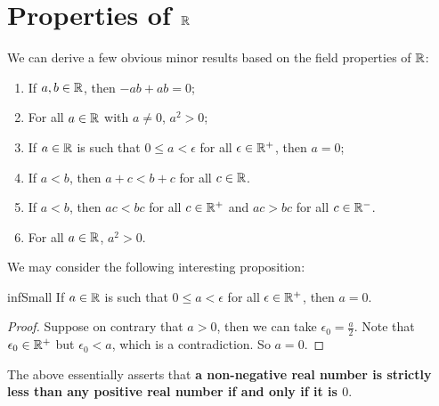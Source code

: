 \documentclass[math]{amznotes}
\theoremstyle{remark}
\begin{document}
\section{Properties of $\mathbb{R}$}
We can derive a few obvious minor results based on the field properties of $\mathbb{R}$:
\begin{enumerate}
    \item If $a, b \in \mathbb{R}$, then $-ab + ab = 0$;
    \item For all $a \in \mathbb{R}$ with $a \neq 0$, $a^2 > 0$;
    \item If $a \in \mathbb{R}$ is such that $0 \leq a < \epsilon$ for all $\epsilon \in \mathbb{R}^+$, then $a = 0$;
    \item If $a < b$, then $a + c < b + c$ for all $c \in \mathbb{R}$.
    \item If $a < b$, then $ac < bc$ for all $c \in \mathbb{R}^+$ and $ac > bc$ for all $c \in \mathbb{R}^-$.
    \item For all $a \in \mathbb{R}$, $a^2 > 0$.
\end{enumerate}
We may consider the following interesting proposition:
\begin{probox}{}{infSmall}
    If $a \in \mathbb{R}$ is such that $0 \leq a < \epsilon$ for all $\epsilon \in \mathbb{R}^+$, then $a = 0$.
    \tcblower
    \begin{proof}
        Suppose on contrary that $a > 0$, then we can take $\epsilon_0 = \frac{a}{2}$. Note that $\epsilon_0 \in \mathbb{R}^+$ but $\epsilon_0 < a$, which is a contradiction. So $a = 0$.
    \end{proof}
\end{probox}
The above essentially asserts that \textbf{a non-negative real number is strictly less than any positive real number if and only if it is $0$}.
\end{document}
